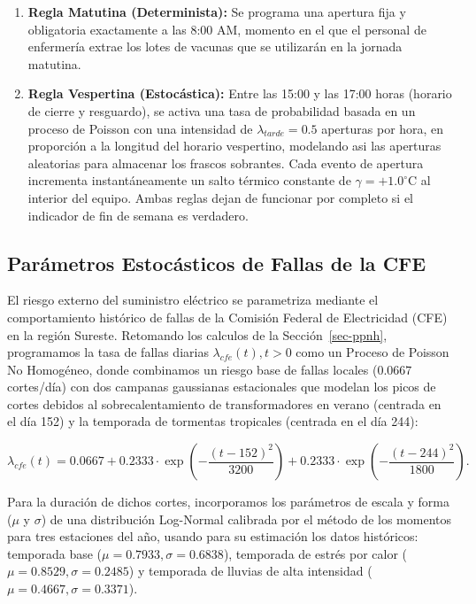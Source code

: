\documentclass[
  spanish,
  letterpaper,
  DIV=11,
  numbers=noendperiod]{scrreprt}
\theoremstyle{plain}
\theoremstyle{definition}
\theoremstyle{remark}
\begin{document}
\begin{enumerate}
\def\labelenumi{\alph{enumi})}
\item
  \textbf{Regla Matutina (Determinista):} Se programa una apertura fija
  y obligatoria exactamente a las 8:00 AM, momento en el que el personal
  de enfermería extrae los lotes de vacunas que se utilizarán en la
  jornada matutina.
\item
  \textbf{Regla Vespertina (Estocástica):} Entre las 15:00 y las 17:00
  horas (horario de cierre y resguardo), se activa una tasa de
  probabilidad basada en un proceso de Poisson con una intensidad de
  \(\lambda_{tarde} = 0.5\) aperturas por hora, en proporción a la
  longitud del horario vespertino, modelando asi las aperturas
  aleatorias para almacenar los frascos sobrantes. Cada evento de
  apertura incrementa instantáneamente un salto térmico constante de
  \(\gamma = +1.0^\circ\text{C}\) al interior del equipo. Ambas reglas
  dejan de funcionar por completo si el indicador de fin de semana es
  verdadero.
\end{enumerate}

\subsection{Parámetros Estocásticos de Fallas de la
CFE}\label{paruxe1metros-estocuxe1sticos-de-fallas-de-la-cfe}

El riesgo externo del suministro eléctrico se parametriza mediante el
comportamiento histórico de fallas de la Comisión Federal de
Electricidad (CFE) en la región Sureste. Retomando los calculos de la
Sección~\ref{sec-ppnh}, programamos la tasa de fallas diarias
\(\lambda_{cfe}(t), t > 0\) como un Proceso de Poisson No Homogéneo,
donde combinamos un riesgo base de fallas locales (\(0.0667\)
cortes/día) con dos campanas gaussianas estacionales que modelan los
picos de cortes debidos al sobrecalentamiento de transformadores en
verano (centrada en el día 152) y la temporada de tormentas tropicales
(centrada en el día 244):

\[
\lambda_{cfe}(t) = 0.0667 + 0.2333 \cdot \exp\left(-\frac{(t - 152)^2}{3200}\right) + 0.2333 \cdot \exp\left(-\frac{(t - 244)^2}{1800}\right).
\]

Para la duración de dichos cortes, incorporamos los parámetros de escala
y forma (\(\mu\) y \(\sigma\)) de una distribución Log-Normal calibrada
por el método de los momentos para tres estaciones del año, usando para
su estimación los datos históricos: temporada base
(\(\mu = 0.7933, \sigma = 0.6838\)), temporada de estrés por calor
(\(\mu = 0.8529, \sigma = 0.2485\)) y temporada de lluvias de alta
intensidad (\(\mu = 0.4667, \sigma = 0.3371\)).
\end{document}
